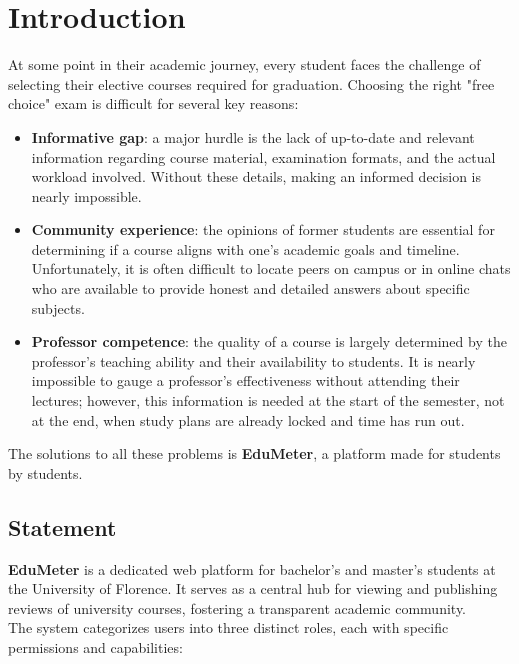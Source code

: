 \section{Introduction}

At some point in their academic journey, every student faces the challenge of selecting their elective courses required for graduation. Choosing the right "free choice" exam is difficult for several key reasons:

\begin{itemize}
	
	\item \textbf{Informative gap}: a major hurdle is the lack of up-to-date and relevant information regarding course material, examination formats, and the actual workload involved. Without these details, making an informed decision is nearly impossible.
	
	\item \textbf{Community experience}: the opinions of former students are essential for determining if a course aligns with one's academic goals and timeline. Unfortunately, it is often difficult to locate peers on campus or in online chats who are available to provide honest and detailed answers about specific subjects.
	
	\item \textbf{Professor competence}: the quality of a course is largely determined by the professor's teaching ability and their availability to students. It is nearly impossible to gauge a professor’s effectiveness without attending their lectures; however, this information is needed at the start of the semester, not at the end, when study plans are already locked and time has run out.
	
\end{itemize}

\noindent The solutions to all these problems is \textbf{EduMeter}, a platform made for students by students. 

\subsection{Statement}

\textbf{EduMeter} is a dedicated web platform for bachelor’s and master’s students at the University of Florence. It serves as a central hub for viewing and publishing reviews of university courses, fostering a transparent academic community. \\

The system categorizes users into three distinct roles, each with specific permissions and capabilities:

